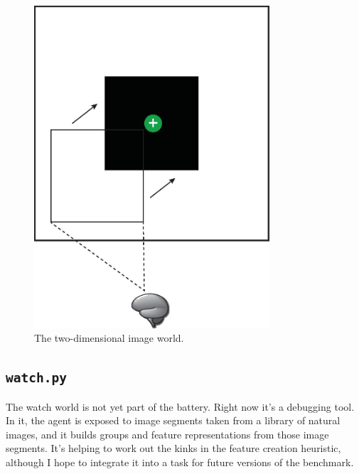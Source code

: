 \begin{figure}
\centering
\includegraphics[height=12cm]{figs/image_world_2D.eps}
\caption{The two-dimensional image world.}
\label{image_2D}
\end{figure}


\subsection{\texttt{watch.py}}

The watch world is not yet part of the battery. Right now it's a debugging tool. In it, the agent is exposed to image segments taken from a library of natural images, and it builds groups and feature representations from those image segments. It's helping to work out the kinks in the feature creation heuristic, although I hope to integrate it into a task for future versions of the benchmark.

